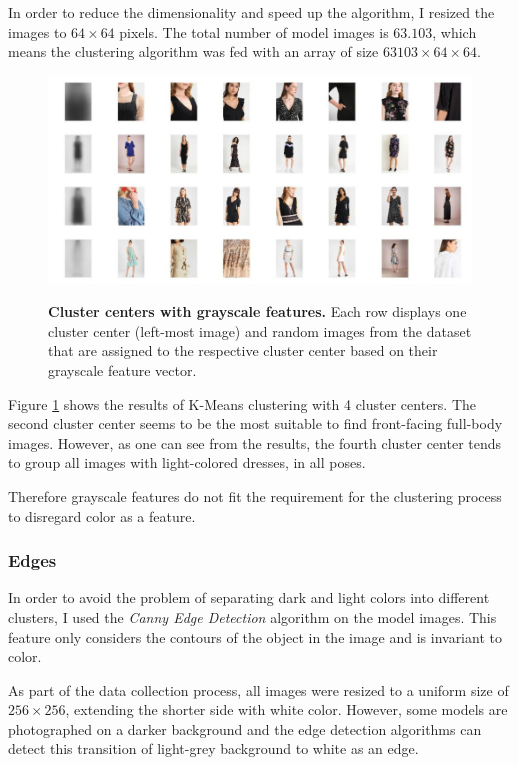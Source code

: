 \documentclass[12pt]{report}
\begin{document}
In order to reduce the dimensionality and speed up the algorithm, I resized the images to $64\times64$ pixels. The total number of model images is $63.103$, which means the clustering algorithm was fed with an array of size $63103\times64\times64$.

\begin{figure}[h]
\centering
{\includegraphics[width=\linewidth]{04_experiments/clustering/grayscale}}
\caption{\label{fig:cluster_gray} \textbf{Cluster centers with grayscale features.} Each row displays one cluster center (left-most image) and random images from the dataset that are assigned to the respective cluster center based on their grayscale feature vector.}
\end{figure}

Figure \ref{fig:cluster_gray} shows the results of K-Means clustering with 4 cluster centers. The second cluster center seems to be the most suitable to find front-facing full-body images. However, as one can see from the results, the fourth cluster center tends to group all images with light-colored dresses, in all poses. 

Therefore grayscale features do not fit the requirement for the clustering process to disregard color as a feature.


\subsubsection{Edges}
In order to avoid the problem of separating dark and light colors into different clusters, I used the \textit{Canny Edge Detection} algorithm on the model images. This feature only considers the contours of the object in the image and is invariant to color.

As part of the data collection process, all images were resized to a uniform size of $256\times256$, extending the shorter side with white color. However, some models are photographed on a darker background and the edge detection algorithms can detect this transition of light-grey background to white as an edge.
\end{document}
